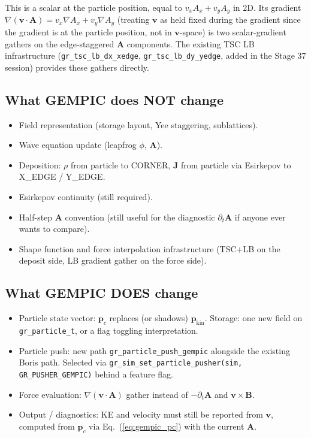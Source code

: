 \documentclass[11pt,a4paper]{article}
\newcommand{\vv}[1]{\mathbf{#1}}
\begin{document}
This is a scalar at the particle position, equal to $v_x A_x + v_y A_y$
in 2D.  Its gradient $\nabla(\vv{v}\cdot\vv{A}) = v_x \nabla A_x + v_y \nabla A_y$
(treating $\vv{v}$ as held fixed during the gradient since the
gradient is at the particle position, not in $\vv{v}$-space) is two
scalar-gradient gathers on the edge-staggered $\vv{A}$ components.
The existing TSC LB infrastructure
(\texttt{gr\_tsc\_lb\_dx\_xedge}, \texttt{gr\_tsc\_lb\_dy\_yedge},
added in the Stage 37 session) provides these gathers directly.

\subsection{What GEMPIC does NOT change}

\begin{itemize}
  \item Field representation (storage layout, Yee staggering, sublattices).
  \item Wave equation update (leapfrog $\phi$, $\vv{A}$).
  \item Deposition: $\rho$ from particle to CORNER, $\vv{J}$ from
    particle via Esirkepov to X\_EDGE / Y\_EDGE.
  \item Esirkepov continuity (still required).
  \item Half-step $\vv{A}$ convention (still useful for the
    diagnostic $\partial_t \vv{A}$ if anyone ever wants to compare).
  \item Shape function and force interpolation infrastructure
    (TSC$+$LB on the deposit side, LB gradient gather on the force
    side).
\end{itemize}

\subsection{What GEMPIC DOES change}

\begin{itemize}
  \item Particle state vector: $\vv{p}_c$ replaces (or shadows)
    $\vv{p}_{\mathrm{kin}}$.  Storage: one new field on
    \texttt{gr\_particle\_t}, or a flag toggling interpretation.
  \item Particle push: new path
    \texttt{gr\_particle\_push\_gempic} alongside the existing
    Boris path.  Selected via
    \texttt{gr\_sim\_set\_particle\_pusher(sim, GR\_PUSHER\_GEMPIC)}
    behind a feature flag.
  \item Force evaluation: $\nabla(\vv{v}\cdot\vv{A})$ gather instead
    of $-\partial_t\vv{A}$ and $\vv{v}\times\vv{B}$.
  \item Output / diagnostics: KE and velocity must still be reported
    from $\vv{v}$, computed from $\vv{p}_c$ via
    Eq.~(\ref{eq:gempic_pc}) with the current $\vv{A}$.
\end{itemize}
\end{document}
